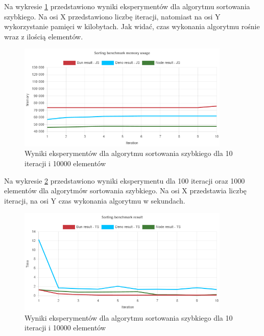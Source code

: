 Na wykresie \ref{fig:radix_sorting_e4_memory_js} przedstawiono wyniki eksperymentów dla algorytmu sortowania szybkiego. Na osi X przedstawiono liczbę iteracji, natomiast na osi Y wykorzystanie pamięci w kilobytach. Jak widać, czas wykonania algorytmu rośnie wraz z ilością elementów.
\begin{figure}[H]
  \centering
  \includegraphics[width=0.9\textwidth]{Figures/sorting/radix/e4_memory_js.png}
  \caption{Wyniki eksperymentów dla algorytmu sortowania szybkiego dla 10 iteracji i 10000 elementów}
  \label{fig:radix_sorting_e4_memory_js}
\end{figure}

Na wykresie \ref{fig:radix_sorting_e4_ts} przedstawiono wyniki eksperymentu dla 100 iteracji oraz 1000 elementów dla algorytmów sortowania szybkiego. Na osi X przedstawia liczbę iteracji, na osi Y czas wykonania algorytmu w sekundach. 

\begin{figure}[H]
  \centering
  \includegraphics[width=0.9\textwidth]{Figures/sorting/radix/e4_ts.png}
  \caption{Wyniki eksperymentów dla algorytmu sortowania szybkiego dla 10 iteracji i 10000 elementów}
  \label{fig:radix_sorting_e4_ts}
\end{figure}

